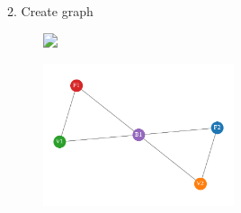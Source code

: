\documentclass[handout]{beamer}
\begin{document}
\begin{frame}{2. Create graph}

    \begin{figure}
        \centering
        \includegraphics<1->[width=0.8\textwidth]{../Figures/toy-1.png}
    \end{figure}
    \begin{figure}
        \centering
        \includegraphics[width=0.5\textwidth]{../Figures/toy_graph.pdf}
    \end{figure}
\end{frame}
\end{document}
